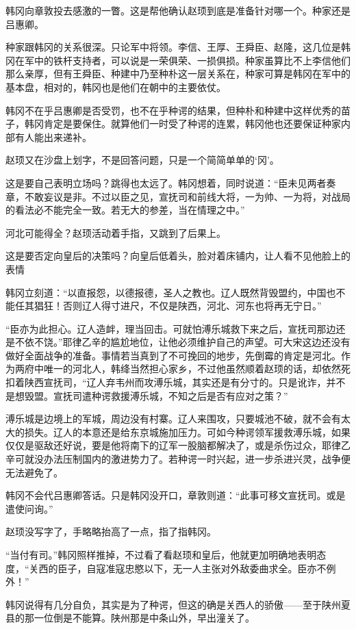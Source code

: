 韩冈向章敦投去感激的一瞥。这是帮他确认赵顼到底是准备针对哪一个。种家还是吕惠卿。

种家跟韩冈的关系很深。只论军中将领。李信、王厚、王舜臣、赵隆，这几位是韩冈在军中的铁杆支持者，可以说是一荣俱荣、一损俱损。种家虽算比不上李信他们那么亲厚，但有王舜臣、种建中乃至种朴这一层关系在，种家可算是韩冈在军中的基本盘，相对的，韩冈也是他们在朝中的主要依仗。

韩冈不在乎吕惠卿是否受罚，也不在乎种谔的结果，但种朴和种建中这样优秀的苗子，韩冈肯定是要保住。就算他们一时受了种谔的连累，韩冈他也还要保证种家内部有人能出来递补。

赵顼又在沙盘上划字，不是回答问题，只是一个简简单单的‘冈’。

这是要自己表明立场吗？跳得也太远了。韩冈想着，同时说道：“臣未见两者奏章，不敢妄议是非。不过以臣之见，宣抚司和前线大将，一为帅、一为将，对战局的看法必不能完全一致。若无大的参差，当在情理之中。”

河北可能得全？赵顼活动着手指，又跳到了后果上。

这是要否定向皇后的决策吗？向皇后低着头，脸对着床铺内，让人看不见他脸上的表情

韩冈立刻道：“以直报怨，以德报德，圣人之教也。辽人既然背毁盟约，中国也不能任其猖狂！否则辽人得寸进尺，不仅是陕西，河北、河东也将再无宁日。”

“臣亦为此担心。辽人造衅，理当回击。可就怕溥乐城救下来之后，宣抚司那边还是不依不饶。”耶律乙辛的尴尬地位，让他必须维护自己的声望。可大宋这边还没有做好全面战争的准备。事情若当真到了不可挽回的地步，先倒霉的肯定是河北。作为两府中唯一的河北人，韩绛当然担心家乡，不过他虽然顺着赵顼的话，却依然死扣着陕西宣抚司，“辽人弃韦州而攻溥乐城，其实还是有分寸的。只是讹诈，并不是想毁盟。宣抚司遣种谔救援溥乐城，不知之后是否有应对之策？”

溥乐城是边境上的军城，周边没有村寨。辽人来围攻，只要城池不破，就不会有太大的损失。辽人的本意还是给东京城施加压力。可如今种谔领军援救溥乐城，如果仅仅是驱敌还好说，要是他将南下的辽军一股脑都解决了，或是杀伤过众，耶律乙辛可就没办法压制国内的激进势力了。若种谔一时兴起，进一步杀进兴灵，战争便无法避免了。

韩冈不会代吕惠卿答话。只是韩冈没开口，章敦则道：“此事可移文宣抚司。或是遣使问询。”

赵顼没写字了，手略略抬高了一点，指了指韩冈。

“当付有司。”韩冈照样推掉，不过看了看赵顼和皇后，他就更加明确地表明态度，“关西的臣子，自寇准寇忠愍以下，无一人主张对外敌委曲求全。臣亦不例外！”

韩冈说得有几分自负，其实是为了种谔，但这的确是关西人的骄傲——至于陕州夏县的那一位倒是不能算。陕州那是中条山外，早出潼关了。

